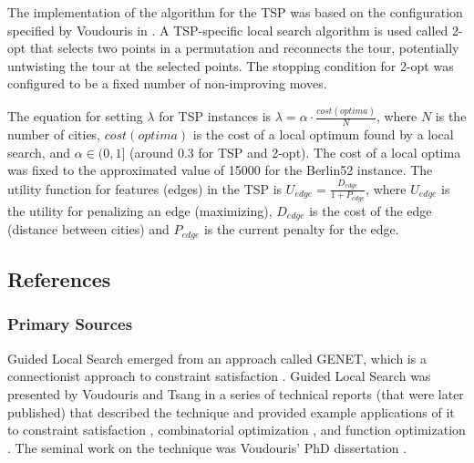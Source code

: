 The implementation of the algorithm for the TSP was based on the configuration specified by Voudouris in \cite{Voudouris1997}.
A TSP-specific local search algorithm is used called 2-opt that selects two points in a permutation and reconnects the tour, potentially untwisting the tour at the selected points. The stopping condition for 2-opt was configured to be a fixed number of non-improving moves.

The equation for setting $\lambda$ for TSP instances is $\lambda = \alpha\cdot\frac{cost(optima)}{N}$, where $N$ is the number of cities, $cost(optima)$ is the cost of a local optimum found by a local search, and $\alpha\in (0,1]$ (around 0.3 for TSP and 2-opt). The cost of a local optima was fixed to the approximated value of 15000 for the Berlin52 instance. 
The utility function for features (edges) in the TSP is $U_{edge}=\frac{D_{edge}}{1+P_{edge}}$, where $U_{edge}$ is the utility for penalizing an edge (maximizing), $D_{edge}$ is the cost of the edge (distance between cities) and $P_{edge}$ is the current penalty for the edge.



\subsection{References}

% 
% 
\subsubsection{Primary Sources}
Guided Local Search emerged from an approach called GENET, which is a connectionist approach to constraint satisfaction \cite{Wang1991, Tsang1992}.
Guided Local Search was presented by Voudouris and Tsang in a series of technical reports (that were later published) that described the technique and provided example applications of it to constraint satisfaction \cite{Voudouris1994}, combinatorial optimization \cite{Voudouris1995b, Voudouris1995}, and function optimization \cite{Voudouris1995a}.
The seminal work on the technique was Voudouris' PhD dissertation \cite{Voudouris1997}.


